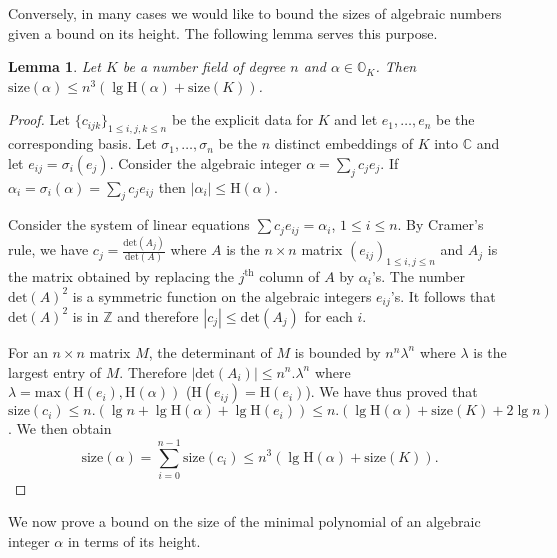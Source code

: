 \documentclass[11pt]{madras}%
\newtheorem{lemma}[theorem]{Lemma}
\theoremstyle{remark}
\newcommand{\size}[1]{{\ensuremath{\mathrm{size}\left(#1\right)}}}
\newcommand{\Height}[1]{\ensuremath{\mathrm{H}\left(#1\right)}}
\newcommand{\Int}[1][]{{\ensuremath{\mathbb{O}_{#1}}}}
\begin{document}
Conversely, in many cases we would like to bound the sizes of
algebraic numbers given a bound on its height. The following lemma
serves this purpose.

\begin{lemma}\label{lem-bound-on-size-height}%
  Let $K$ be a number field of degree $n$ and $\alpha \in \Int[K]$.
  Then $\size{\alpha} \leq n^3 (\lg{\Height{\alpha}} + \size{K})$.
\end{lemma}
\begin{proof}
  Let $\{c_{ijk}\}_{1\leq i,j,k\leq n}$ be the explicit data for $K$
  and let $e_1,\ldots,e_n$ be the corresponding basis.  Let
  $\sigma_1,\ldots,\sigma_n$ be the $n$ distinct embeddings of $K$
  into $\mathbb{C}$ and let $e_{ij} = \sigma_i (e_j)$. Consider the
  algebraic integer $\alpha = \sum_j c_j e_j$. If $\alpha_i =
  \sigma_i(\alpha) = \sum_j c_j e_{ij}$ then $| \alpha_i | \leq
  \Height{\alpha}$.

  Consider the system of linear equations $\sum c_j e_{ij} =
  \alpha_i$, $1\leq i\leq n$.  By Cramer's rule, we have $c_j =
  \frac{\mathrm{det}(A_j)}{\mathrm{det}(A)}$ where $A$ is the $n
  \times n $ matrix $(e_{ij})_{1 \leq i,j \leq n}$ and $A_j$ is the
  matrix obtained by replacing the $j^{\mathrm{th}}$ column of $A$ by
  $\alpha_i$'s.  The number $\mathrm{det}(A)^2$ is a symmetric
  function on the algebraic integers $e_{ij}$'s. It follows that
  $\mathrm{det}(A)^2$ is in $\mathbb{Z}$ and therefore $|c_j|\leq
  \mathrm{det}(A_j)$ for each $i$.

  For an $n\times n$ matrix $M$, the determinant of $M$ is bounded by
  $n^n \lambda^n$ where $\lambda$ is the largest entry of $M$.
  Therefore $|\mathrm{det}(A_i)| \leq n^n.\lambda^n$ where $\lambda =
  \mathrm{max}(\Height{e_i},\Height{\alpha})$ ($\Height{e_{ij}} =
  \Height{e_i}$). We have thus proved that $\size{c_i}\leq n.(\lg n +
  \lg\Height{\alpha} + \lg\Height{e_i})\leq n.(\lg\Height{\alpha} +
  \size{K} + 2 \lg{n})$.  We then obtain
  \[
  \size{\alpha} =\sum_{i=0}^{n-1}\size{c_i} \leq
  n^3(\lg\Height{\alpha} + \size{K}).
  \]
\end{proof}


We now prove a bound on the size of the minimal polynomial of an
algebraic integer $\alpha$ in terms of its height.
\end{document}
